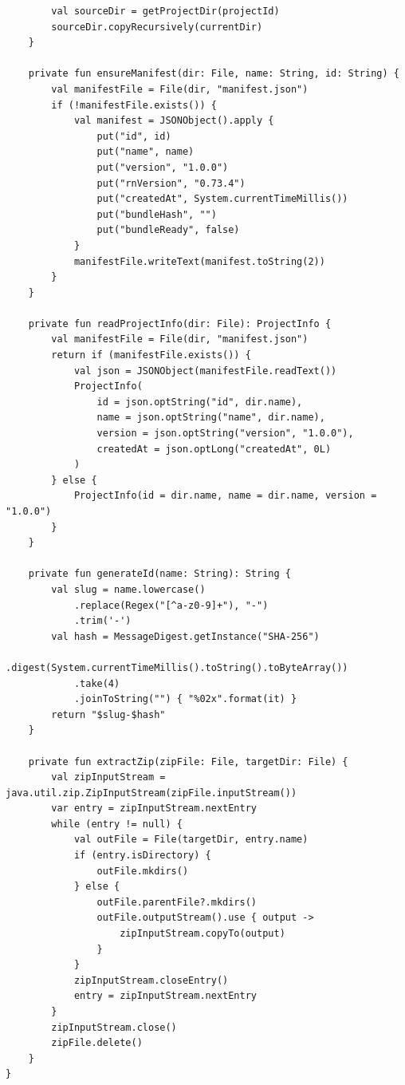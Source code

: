 \documentclass[11pt]{article}
\begin{document}
\begin{verbatim}
        val sourceDir = getProjectDir(projectId)
        sourceDir.copyRecursively(currentDir)
    }

    private fun ensureManifest(dir: File, name: String, id: String) {
        val manifestFile = File(dir, "manifest.json")
        if (!manifestFile.exists()) {
            val manifest = JSONObject().apply {
                put("id", id)
                put("name", name)
                put("version", "1.0.0")
                put("rnVersion", "0.73.4")
                put("createdAt", System.currentTimeMillis())
                put("bundleHash", "")
                put("bundleReady", false)
            }
            manifestFile.writeText(manifest.toString(2))
        }
    }

    private fun readProjectInfo(dir: File): ProjectInfo {
        val manifestFile = File(dir, "manifest.json")
        return if (manifestFile.exists()) {
            val json = JSONObject(manifestFile.readText())
            ProjectInfo(
                id = json.optString("id", dir.name),
                name = json.optString("name", dir.name),
                version = json.optString("version", "1.0.0"),
                createdAt = json.optLong("createdAt", 0L)
            )
        } else {
            ProjectInfo(id = dir.name, name = dir.name, version = "1.0.0")
        }
    }

    private fun generateId(name: String): String {
        val slug = name.lowercase()
            .replace(Regex("[^a-z0-9]+"), "-")
            .trim('-')
        val hash = MessageDigest.getInstance("SHA-256")
            .digest(System.currentTimeMillis().toString().toByteArray())
            .take(4)
            .joinToString("") { "%02x".format(it) }
        return "$slug-$hash"
    }

    private fun extractZip(zipFile: File, targetDir: File) {
        val zipInputStream = java.util.zip.ZipInputStream(zipFile.inputStream())
        var entry = zipInputStream.nextEntry
        while (entry != null) {
            val outFile = File(targetDir, entry.name)
            if (entry.isDirectory) {
                outFile.mkdirs()
            } else {
                outFile.parentFile?.mkdirs()
                outFile.outputStream().use { output ->
                    zipInputStream.copyTo(output)
                }
            }
            zipInputStream.closeEntry()
            entry = zipInputStream.nextEntry
        }
        zipInputStream.close()
        zipFile.delete()
    }
}
\end{verbatim}
\end{document}
